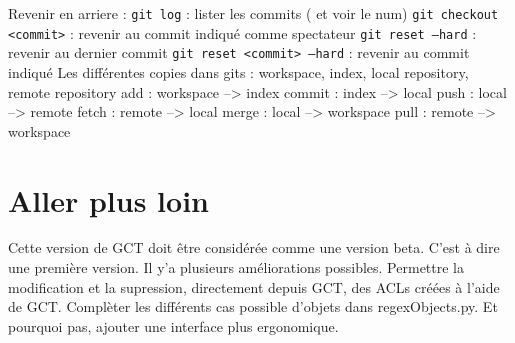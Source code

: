 \documentclass{article}
\begin{document}
    \noindent Revenir en arriere : \bigbreak
    \noindent\texttt{git log} : lister les commits ( et voir le num) \smallbreak
    \noindent\texttt{git checkout <commit>} : revenir au commit indiqué comme spectateur \smallbreak
    \noindent\texttt{git reset --hard} : revenir au dernier commit \smallbreak
    \noindent\texttt{git reset <commit> --hard} : revenir au commit indiqué \bigbreak
    \noindent Les différentes copies dans gits : \bigbreak
    \noindent workspace, index, local repository, remote repository \bigbreak
    \noindent add : workspace --> index \smallbreak
    \noindent commit : index --> local \smallbreak
    \noindent push : local --> remote \smallbreak
    \noindent fetch : remote --> local \smallbreak
    \noindent merge : local --> workspace \smallbreak
    \noindent pull : remote --> workspace

  \section{Aller plus loin}

    \noindent Cette version de GCT doit être considérée comme une version beta. C'est à dire une première version.
    Il y'a plusieurs améliorations possibles. Permettre la modification et la supression, directement depuis GCT, des ACLs créées
    à l'aide de GCT. Complèter les différents cas possible d'objets dans regexObjects.py. Et pourquoi pas, ajouter une interface plus
    ergonomique.
\end{document}

